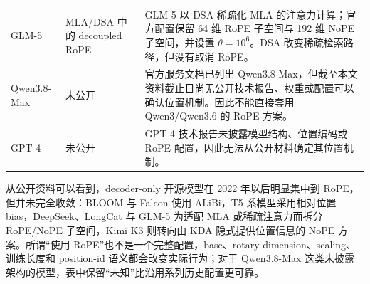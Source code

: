 \documentclass[UTF8,fontset=none,a4paper,10pt]{ctexart}
\begin{document}
\begin{longtable}{@{}p{2.7cm}p{3.6cm}p{8.0cm}@{}}
GLM-5 & MLA/DSA 中的 decoupled RoPE & GLM-5 以 DSA 稀疏化 MLA 的注意力计算；官方配置保留 64 维 RoPE 子空间与 192 维 NoPE 子空间，并设置 $\theta=10^6$。DSA 改变稀疏检索路径，但没有取消 RoPE\cite{zh:glm5,zh:glm5config}。\\

Qwen3.8-Max & 未公开 & 官方服务文档已列出 Qwen3.8-Max，但截至本文资料截止日尚无公开技术报告、权重或配置可以确认位置机制。因此不能直接套用 Qwen3/Qwen3.6 的 RoPE 方案\cite{zh:qwen38docs}。\\

GPT-4 & 未公开 & GPT-4 技术报告未披露模型结构、位置编码或 RoPE 配置，因此无法从公开材料确定其位置机制\cite{zh:openai2023gpt4}。\\

\end{longtable}

从公开资料可以看到，decoder-only 开源模型在 2022 年以后明显集中到 RoPE，但并未完全收敛：BLOOM 与 Falcon 使用 ALiBi，T5 系模型采用相对位置 bias，DeepSeek、LongCat 与 GLM-5 为适配 MLA 或稀疏注意力而拆分 RoPE/NoPE 子空间，Kimi K3 则转向由 KDA 隐式提供位置信息的 NoPE 方案。所谓“使用 RoPE”也不是一个完整配置，base、rotary dimension、scaling、训练长度和 position-id 语义都会改变实际行为；对于 Qwen3.8-Max 这类未披露架构的模型，表中保留“未知”比沿用系列历史配置更可靠。
\end{document}
